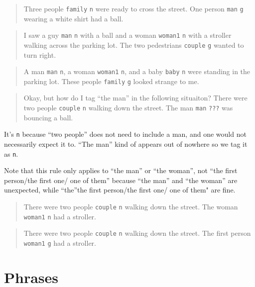 \documentclass[
]{book}
\begin{document}
\begin{quote}
Three people \texttt{family} \texttt{n} were ready to cross the street.
One person \texttt{man} \texttt{g} wearing a white shirt had a ball.
\end{quote}

\begin{quote}
I saw a guy \texttt{man} \texttt{n} with a ball and a woman \texttt{woman1} \texttt{n} with a stroller walking across the parking lot.
The two pedestrians \texttt{couple} \texttt{g} wanted to turn right.
\end{quote}

\begin{quote}
A man \texttt{man} \texttt{n}, a woman \texttt{woman1} \texttt{n}, and a baby \texttt{baby} \texttt{n} were standing in the parking lot.
These people \texttt{family} \texttt{g} looked strange to me.
\end{quote}

\begin{quote}
Okay, but how do I tag ``the man'' in the following situaiton?
There were two people \texttt{couple} \texttt{n} walking down the street.
The man \texttt{man} \texttt{???} was bouncing a ball.
\end{quote}

It's \texttt{n} because
``two people'' does not need to include a man, and one would not necessarily
expect it to.
``The man'' kind of appears out of nowhere so we tag it as \texttt{n}.

Note that this rule only applies to ``the man'' or ``the woman'', not ``the first person/the first one/ one of them''
because ``the man'' and ``the woman'' are unexpected, while ``the''the first person/the first one/ one of them" are fine.

\begin{quote}
There were two people \texttt{couple} \texttt{n} walking down the street.
The woman \texttt{woman1} \texttt{n} had a stroller.
\end{quote}

\begin{quote}
There were two people \texttt{couple} \texttt{n} walking down the street.
The first person \texttt{woman1} \texttt{g} had a stroller.
\end{quote}

\hypertarget{phrases}{%
\section{Phrases}\label{phrases}}
\end{document}
